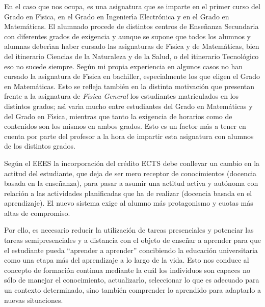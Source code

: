 En el caso que nos ocupa, es una asignatura que se imparte en el
primer curso del
Grado en F\'{\i}sica, en el Grado en Ingenier\'{\i}a Electr\'{o}nica
y en el Grado en Matem\'{a}ticas. El alumnado procede de distintos
centros de Ense\~{n}anza Secundaria con diferentes grados de exigencia
 y aunque se supone que todos 
los alumnos y alumnas deber\'{\i}an haber cursado las asignaturas de F\'{\i}sica y de 
Matem\'{a}ticas, bien del itinerario Ciencias de la Naturaleza 
y de la Salud, 
o del itinerario  Tecnol\'{o}gico eso no sucede siempre. Seg\'{u}n mi propia 
experiencia en algunos casos no han cursado la asignatura de F\'{\i}sica
en bachiller, especialmente los que eligen el Grado en Matem\'{a}ticas. Esto se
refleja tambi\'{e}n en la distinta motivaci\'{o}n que presentan frente a la 
asignatura de {\it F\'{\i}sica General} los estudiantes
matriculados en los distintos grados; as\'{\i} var\'{\i}a mucho entre
estudiantes del Grado en Matem\'{a}ticas y  del Grado en F\'{\i}sica, mientras
que tanto la exigencia de horarios como de contenidos son los mismos en ambos grados. Esto es un factor m\'{a}s a tener  en cuenta por parte del profesor a la hora de impartir
esta asignatura con alumnos de los distintos grados.


Seg\'{u}n el EEES la incorporaci\'{o}n del cr\'{e}dito
 ECTS debe conllevar un cambio en 
la actitud del estudiante, {  que deja de ser mero receptor}
 de conocimientos
(docencia basada en la {  ense\~{n}anza}),
 para pasar a asumir una {  actitud activa y aut\'{o}noma}
 con relaci\'{o}n a las actividades planificadas
que ha de realizar (docencia basada en el {  aprendizaje}).
El nuevo sistema 
exige al alumno m\'{a}s protagonismo y cuotas m\'{a}s altas de 
compromiso.

Por ello, es necesario reducir la utilizaci\'{o}n de tareas presenciales
y potenciar las {  tareas semipresenciales} y { a distancia} con 
el objeto de ense\~{n}ar a aprender para que el estudiante  pueda 
``aprender a aprender'' concibiendo la educaci\'{o}n universitaria como una 
etapa m\'{a}s del aprendizaje a lo largo de la vida. Esto nos
conduce al concepto de {  formaci\'{o}n continua} mediante la cu\'{a}l
los individuos son capaces no s\'{o}lo de manejar el conocimiento, 
actualizarlo,  seleccionar lo que es adecuado para un contexto determinado,
sino tambi\'{e}n {  comprender lo aprendido } para adaptarlo a nuevas 
situaciones.


